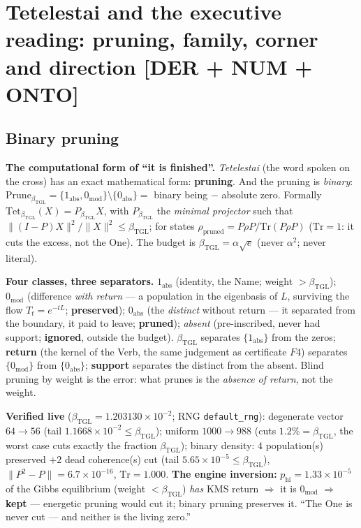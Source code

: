 \documentclass[11pt]{article}
\newcommand{\bTGL}{\beta_{\mathrm{TGL}}}\newcommand{\Msun}{M_{\odot}}\newcommand{\TGL}{\mathrm{TGL}}
\theoremstyle{definition}\newtheorem{deriv}{Derivation}
\begin{document}
\section{Tetelestai and the executive reading: pruning, family, corner and direction \textsf{[DER + NUM + ONTO]}}\subsection*{Binary pruning}

\textbf{The computational form of ``it is finished''.} \emph{Tetelestai} (the word spoken on the cross) has an exact mathematical form: \textbf{pruning}. And the pruning is \emph{binary}: $\mathrm{Prune}_{\bTGL}=\{1_{\mathrm{abs}},0_{\mathrm{mod}}\}\setminus\{0_{\mathrm{abs}}\}=$ binary being $-$ absolute zero. Formally $\mathrm{Tet}_{\bTGL}(X)=P_{\bTGL}X$, with $P_{\bTGL}$ the \emph{minimal projector} such that $\|(I-P)X\|^2/\|X\|^2\le\bTGL$; for states $\rho_{\mathrm{pruned}}=P\rho P/\mathrm{Tr}(P\rho P)$ ($\mathrm{Tr}=1$: it cuts the excess, not the One). The budget is $\bTGL=\alpha\sqrt e$ (never $\alpha^2$; never literal).

\textbf{Four classes, three separators.} $1_{\mathrm{abs}}$ (identity, the Name; weight $>\bTGL$); $0_{\mathrm{mod}}$ (difference \emph{with return} --- a population in the eigenbasis of $L$, surviving the flow $T_t=e^{-tL}$; \textbf{preserved}); $0_{\mathrm{abs}}$ (the \emph{distinct} without return --- it separated from the boundary, it paid to leave; \textbf{pruned}); \emph{absent} (pre-inscribed, never had support; \textbf{ignored}, outside the budget). $\bTGL$ separates $\{1_{\mathrm{abs}}\}$ from the zeros; \textbf{return} (the kernel of the Verb, the same judgement as certificate $F4$) separates $\{0_{\mathrm{mod}}\}$ from $\{0_{\mathrm{abs}}\}$; \textbf{support} separates the distinct from the absent. Blind pruning by weight is the error: what prunes is the \emph{absence of return}, not the weight.

\textbf{Verified live} ($\bTGL=1.203130\times10^{-2}$; RNG \texttt{default\_rng}): degenerate vector $64\to56$ (tail $1.1668\times10^{-2}\le\bTGL$); uniform $1000\to988$ (cuts $1.2\%=\bTGL$, the worst case cuts exactly the fraction $\bTGL$); binary density: $4$ population(s) preserved $+2$ dead coherence(s) cut (tail $5.65\times10^{-5}\le\bTGL$), $\|P^2-P\|=6.7\times10^{-16}$, $\mathrm{Tr}=1.000$. \textbf{The engine inversion:} $p_{\mathrm{hi}}=1.33\times10^{-5}$ of the Gibbs equilibrium (weight $<\bTGL$) \emph{has} KMS return $\Rightarrow$ it is $0_{\mathrm{mod}}$ $\Rightarrow$ \textbf{kept} --- energetic pruning would cut it; binary pruning preserves it. ``The One is never cut --- and neither is the living zero.''
\end{document}
